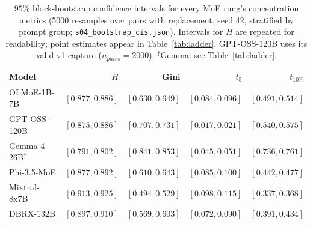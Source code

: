 \documentclass[sigconf]{acmart}
\begin{document}
\begin{table}[t]
\centering\small
\begin{tabular}{lrrrr}
\toprule
Model & $H$ & Gini & $t_5$ & $t_{10\%}$ \\
\midrule
OLMoE-1B-7B          & $[0.877,0.886]$ & $[0.630,0.649]$ & $[0.084,0.096]$ & $[0.491,0.514]$ \\
GPT-OSS-120B         & $[0.875,0.886]$ & $[0.707,0.731]$ & $[0.017,0.021]$ & $[0.540,0.575]$ \\
Gemma-4-26B$^{\ddagger}$ & $[0.791,0.802]$ & $[0.841,0.853]$ & $[0.045,0.051]$ & $[0.736,0.761]$ \\
Phi-3.5-MoE         & $[0.877,0.892]$ & $[0.610,0.643]$ & $[0.085,0.100]$ & $[0.442,0.477]$ \\
Mixtral-8x7B        & $[0.913,0.925]$ & $[0.494,0.529]$ & $[0.098,0.115]$ & $[0.337,0.368]$ \\
DBRX-132B           & $[0.897,0.910]$ & $[0.569,0.603]$ & $[0.072,0.090]$ & $[0.391,0.434]$ \\
\bottomrule
\end{tabular}
\caption{$95\%$ block-bootstrap confidence intervals for every MoE rung's
concentration metrics (5000 resamples over pairs with replacement, seed 42,
stratified by prompt group; \texttt{s04\_bootstrap\_cis.json}). Intervals
for $H$ are repeated for readability; point estimates appear in
Table~\ref{tab:ladder}. GPT-OSS-120B uses its valid v1 capture
($n_{pairs}=2000$). $^{\ddagger}$Gemma: see Table~\ref{tab:ladder}.}
\label{tab:cis}
\end{table}
\end{document}
